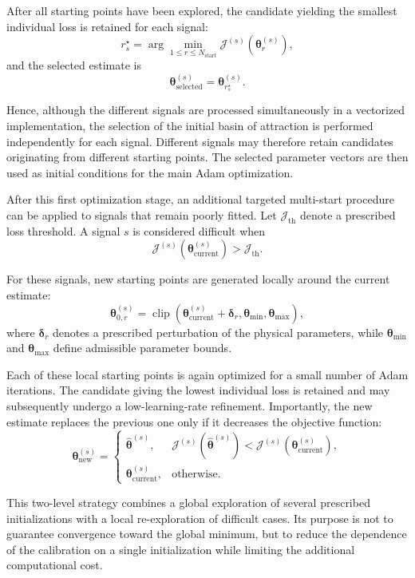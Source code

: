 \documentclass[11pt,a4paper]{report}
\theoremstyle{plain}
\theoremstyle{definition}
\begin{document}
After all starting points have been explored, the candidate yielding the
smallest individual loss is retained for each signal:
\[
r_s^\star
=
\arg\min_{1\leq r\leq N_{\mathrm{start}}}
\mathcal{J}^{(s)}
\left(
\boldsymbol{\theta}_{r}^{(s)}
\right),
\]
and the selected estimate is
\[
\boldsymbol{\theta}_{\mathrm{selected}}^{(s)}
=
\boldsymbol{\theta}_{r_s^\star}^{(s)}.
\]

Hence, although the different signals are processed simultaneously in a
vectorized implementation, the selection of the initial basin of attraction
is performed independently for each signal. Different signals may therefore
retain candidates originating from different starting points. The selected
parameter vectors are then used as initial conditions for the main Adam
optimization.

After this first optimization stage, an additional targeted multi-start
procedure can be applied to signals that remain poorly fitted. Let
\(\mathcal{J}_{\mathrm{th}}\) denote a prescribed loss threshold. A signal
\(s\) is considered difficult when
\[
\mathcal{J}^{(s)}
\left(
\boldsymbol{\theta}_{\mathrm{current}}^{(s)}
\right)
>
\mathcal{J}_{\mathrm{th}}.
\]

For these signals, new starting points are generated locally around the
current estimate:
\[
\boldsymbol{\theta}_{0,r}^{(s)}
=
\operatorname{clip}
\left(
\boldsymbol{\theta}_{\mathrm{current}}^{(s)}
+
\boldsymbol{\delta}_{r},
\boldsymbol{\theta}_{\min},
\boldsymbol{\theta}_{\max}
\right),
\]
where \(\boldsymbol{\delta}_{r}\) denotes a prescribed perturbation of the
physical parameters, while
\(\boldsymbol{\theta}_{\min}\) and
\(\boldsymbol{\theta}_{\max}\) define admissible parameter bounds.

Each of these local starting points is again optimized for a small number
of Adam iterations. The candidate giving the lowest individual loss is
retained and may subsequently undergo a low-learning-rate refinement.
Importantly, the new estimate replaces the previous one only if it decreases
the objective function:
\[
\boldsymbol{\theta}_{\mathrm{new}}^{(s)}
=
\begin{cases}
\widehat{\boldsymbol{\theta}}^{(s)},
&
\mathcal{J}^{(s)}
\left(\widehat{\boldsymbol{\theta}}^{(s)}\right)
<
\mathcal{J}^{(s)}
\left(\boldsymbol{\theta}_{\mathrm{current}}^{(s)}\right),
\\[1ex]
\boldsymbol{\theta}_{\mathrm{current}}^{(s)},
&
\text{otherwise}.
\end{cases}
\]

This two-level strategy combines a global exploration of several prescribed
initializations with a local re-exploration of difficult cases. Its purpose
is not to guarantee convergence toward the global minimum, but to reduce
the dependence of the calibration on a single initialization while limiting
the additional computational cost.
\end{document}

